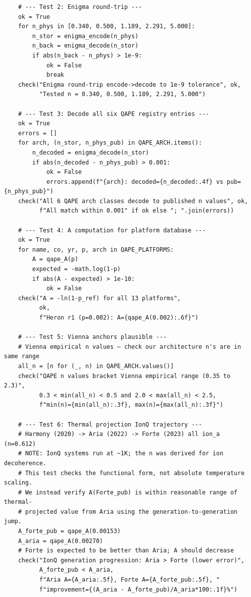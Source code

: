 \documentclass[12pt,a4paper]{article}
\begin{document}
\begin{verbatim}
    # --- Test 2: Enigma round-trip ---
    ok = True
    for n_phys in [0.340, 0.500, 1.189, 2.291, 5.000]:
        n_stor = enigma_encode(n_phys)
        n_back = enigma_decode(n_stor)
        if abs(n_back - n_phys) > 1e-9:
            ok = False
            break
    check("Enigma round-trip encode->decode to 1e-9 tolerance", ok,
          "Tested n = 0.340, 0.500, 1.189, 2.291, 5.000")

    # --- Test 3: Decode all six QAPE registry entries ---
    ok = True
    errors = []
    for arch, (n_stor, n_phys_pub) in QAPE_ARCH.items():
        n_decoded = enigma_decode(n_stor)
        if abs(n_decoded - n_phys_pub) > 0.001:
            ok = False
            errors.append(f"{arch}: decoded={n_decoded:.4f} vs pub={n_phys_pub}")
    check("All 6 QAPE arch classes decode to published n values", ok,
          f"All match within 0.001" if ok else "; ".join(errors))

    # --- Test 4: A computation for platform database ---
    ok = True
    for name, co, yr, p, arch in QAPE_PLATFORMS:
        A = qape_A(p)
        expected = -math.log(1-p)
        if abs(A - expected) > 1e-10:
            ok = False
    check("A = -ln(1-p_ref) for all 13 platforms",
          ok,
          f"Heron r1 (p=0.002): A={qape_A(0.002):.6f}")

    # --- Test 5: Vienna anchors plausible ---
    # Vienna empirical n values — check our architecture n's are in same range
    all_n = [n for (_, n) in QAPE_ARCH.values()]
    check("QAPE n values bracket Vienna empirical range (0.35 to 2.3)",
          0.3 < min(all_n) < 0.5 and 2.0 < max(all_n) < 2.5,
          f"min(n)={min(all_n):.3f}, max(n)={max(all_n):.3f}")

    # --- Test 6: Thermal projection IonQ trajectory ---
    # Harmony (2020) -> Aria (2022) -> Forte (2023) all ion_a (n=0.612)
    # NOTE: IonQ systems run at ~1K; the n was derived for ion decoherence.
    # This test checks the functional form, not absolute temperature scaling.
    # We instead verify A(Forte_pub) is within reasonable range of thermal-
    # projected value from Aria using the generation-to-generation jump.
    A_forte_pub = qape_A(0.00153)
    A_aria = qape_A(0.00270)
    # Forte is expected to be better than Aria; A should decrease
    check("IonQ generation progression: Aria > Forte (lower error)",
          A_forte_pub < A_aria,
          f"Aria A={A_aria:.5f}, Forte A={A_forte_pub:.5f}, "
          f"improvement={(A_aria - A_forte_pub)/A_aria*100:.1f}%")


\end{verbatim}
\end{document}

